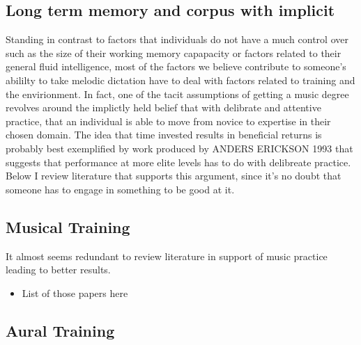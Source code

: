 \documentclass[]{book}
\providecommand{\tightlist}{%
  \setlength{\itemsep}{0pt}\setlength{\parskip}{0pt}}
\theoremstyle{definition}
\theoremstyle{definition}
\theoremstyle{definition}
\theoremstyle{remark}
\begin{document}
\hypertarget{long-term-memory-and-corpus-with-implicit}{%
\subsection{Long term memory and corpus with
implicit}\label{long-term-memory-and-corpus-with-implicit}}

Standing in contrast to factors that individuals do not have a much
control over such as the size of their working memory capapacity or
factors related to their general fluid intelligence, most of the factors
we believe contribute to someone's abililty to take melodic dictation
have to deal with factors related to training and the envirionment. In
fact, one of the tacit assumptions of getting a music degree revolves
around the implictly held belief that with delibrate and attentive
practice, that an individual is able to move from novice to expertise in
their chosen domain. The idea that time invested results in beneficial
returns is probably best exemplified by work produced by ANDERS ERICKSON
1993 that suggests that performance at more elite levels has to do with
delibreate practice. Below I review literature that supports this
argument, since it's no doubt that someone has to engage in something to
be good at it.

\hypertarget{musical-training}{%
\subsection{Musical Training}\label{musical-training}}

It almost seems redundant to review literature in support of music
practice leading to better results.

\begin{itemize}
\tightlist
\item
  List of those papers here
\end{itemize}

\hypertarget{aural-training}{%
\subsection{Aural Training}\label{aural-training}}
\end{document}

